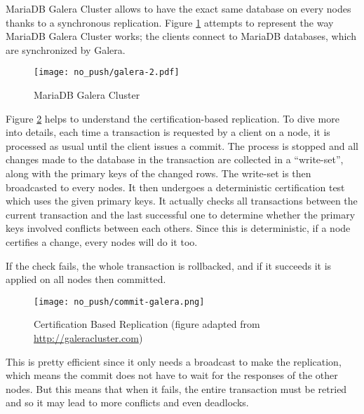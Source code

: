 MariaDB Galera Cluster allows to have the exact same database on every nodes thanks to a synchronous replication. Figure \ref{fig:MGC} attempts to represent the way MariaDB Galera Cluster works; the clients connect to MariaDB databases, which are synchronized by Galera.

\begin{figure}[h]
  \vspace{-10pt}
  \centering
  \centerline{\texttt{[image: no\_push/galera-2.pdf]}}
  \vspace{-5pt}
  \caption{MariaDB Galera Cluster}
  \vspace{-5pt}
  \label{fig:MGC}
\end{figure}

Figure \ref{fig:certificationcommit} helps to understand the certification-based replication. To dive more into details, each time a transaction is requested by a client on a node, it is processed as usual until the client issues a commit. The process is stopped and all changes made to the database in the transaction are collected in a ``write-set'', along with the primary keys of the changed rows. The write-set is then broadcasted to every nodes. It then undergoes a deterministic certification test which uses the given primary keys. It actually checks all transactions between the current transaction and the last successful one to determine whether the primary keys involved conflicts between each others. Since this is deterministic, if a node certifies a change, every nodes will do it too.

If the check fails, the whole transaction is rollbacked, and if it succeeds it is applied on all nodes then committed.

\begin{figure}[h]
  \vspace{-10pt}
  \centering
  \centerline{\texttt{[image: no\_push/commit-galera.png]}}
  \vspace{-5pt}
  \caption{Certification Based Replication (figure adapted from \url{http://galeracluster.com}) }
  \vspace{-5pt}
  \label{fig:certificationcommit}
\end{figure}


This is pretty efficient since it only needs a broadcast to make the replication, which means the commit does not have to wait for the responses of the other nodes. But this means that when it fails, the entire transaction must be retried and so it may lead to more conflicts and even deadlocks.

